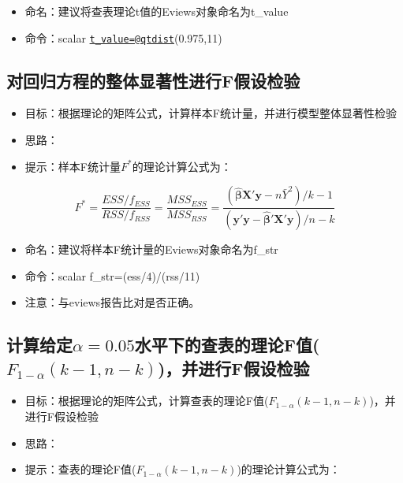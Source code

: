\documentclass[12pt,(landscape,a4paper),(portrait,a4paper)]{article}
\providecommand{\tightlist}{%
  \setlength{\itemsep}{0pt}\setlength{\parskip}{0pt}}
\begin{document}
\begin{itemize}
\tightlist
\item
  命名：建议将查表理论t值的Eviews对象命名为t\_value
\item
  命令：scalar
  \href{mailto:t_value=@qtdist}{\nolinkurl{t\_value=@qtdist}}(0.975,11)
\end{itemize}

\hypertarget{f}{%
\subsection{对回归方程的整体显著性进行F假设检验}\label{f}}

\begin{itemize}
\tightlist
\item
  目标：根据理论的矩阵公式，计算样本F统计量，并进行模型整体显著性检验
\item
  思路：
\item
  提示：样本F统计量\(F^{\ast}\)的理论计算公式为：
\end{itemize}

\[F^{\ast}=\frac{ESS/{f_{ESS}}}{RSS/{f_{RSS}}}=\frac{MSS_{ESS}}{MSS_{RSS}}=\frac{(\mathbf{\hat{\beta}X'y}-n\bar{Y}^2)/{k-1}}{{(\mathbf{y'y-\hat{\beta}'X'y})}/{n-k}}\]

\begin{itemize}
\tightlist
\item
  命名：建议将样本F统计量的Eviews对象命名为f\_str\\
\item
  命令：scalar f\_str=(ess/4)/(rss/11)
\item
  注意：与eviews报告比对是否正确。
\end{itemize}

\hypertarget{alpha0.05ff_1-alphak-1n-kf}{%
\subsection{\texorpdfstring{计算给定\(\alpha=0.05\)水平下的查表的理论F值(\(F_{1-\alpha}(k-1,n-k)\))，并进行F假设检验}{计算给定\textbackslash{}alpha=0.05水平下的查表的理论F值(F\_\{1-\textbackslash{}alpha\}(k-1,n-k))，并进行F假设检验}}\label{alpha0.05ff_1-alphak-1n-kf}}

\begin{itemize}
\tightlist
\item
  目标：根据理论的矩阵公式，计算查表的理论F值(\(F_{1-\alpha}(k-1,n-k)\))，并进行F假设检验
\item
  思路：
\item
  提示：查表的理论F值(\(F_{1-\alpha}(k-1,n-k)\))的理论计算公式为：
\end{itemize}
\end{document}
